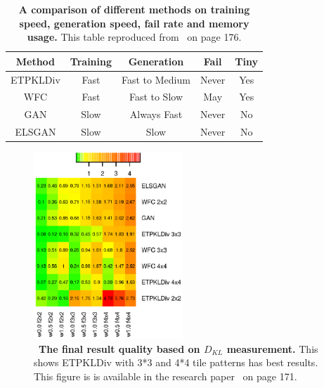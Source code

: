 \documentclass[runningheads]{llncs}
\begin{document}
\begin{table}[h!]
\centering
\begin{tabular}{c| c| c| c| c} 
 Method & Training & Generation & Fail & Tiny \\ [0.5ex] 
 \hline
 ETPKLDiv & Fast & Fast to Medium & Never & Yes \\ 
 WFC & Fast & Fast to Slow & May & Yes \\
 GAN & Slow & Always Fast & Never & No \\
 ELSGAN & Slow & Slow & Never & No \\ [1ex] 

\end{tabular}
\caption{\textbf{A comparison of different methods on training speed, generation speed, fail rate and memory usage.} This table reproduced from~\cite{ref_lncs1} on page 176. }
\label{table1}
\end{table}

\begin{figure}
\includegraphics[width=0.5\textwidth]{Figure3.eps}
\centering
\caption{ ~\textbf{The final result quality based on \(D_{KL} \) measurement.} This shows ETPKLDiv with 3*3 and 4*4 tile patterns has best results. This figure is  is available in the research paper~\cite{ref_lncs1} on page 171.} \label{Figure3}
\end{figure}
\end{document}
